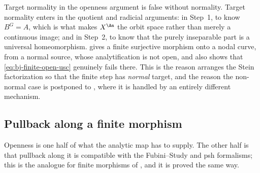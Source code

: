 \begin{warning}{Target normality in the openness argument}
\label{warn:ch41-openness-normality}
 is false without normality.  Target normality enters in the quotient and radicial arguments: in Step~1, to know $B^G=A$, which is what makes
$X^{\An}$ the orbit space rather than merely a continuous image; and in
Step~2, to know that the purely inseparable part is a universal
homeomorphism.   gives a finite surjective
morphism onto a nodal curve, from a normal source, whose analytification is
not open, and  also shows that
\eqref{eq:bj-finite-open-usc} genuinely fails there.  This is the reason
 arranges the Stein factorization so that the
finite step has \emph{normal} target, and the reason the non-normal case is
postponed to
,
where it is handled by an entirely different mechanism.
\end{warning}

\subsection{Pullback along a finite morphism}
\label{sec:ch41-finite-pullback}

Openness is one half of what the analytic map has to supply.  The other
half is that pullback along it is compatible with the Fubini--Study and psh
formalisms; this is the analogue for finite morphisms of
, and it is proved the same way.

